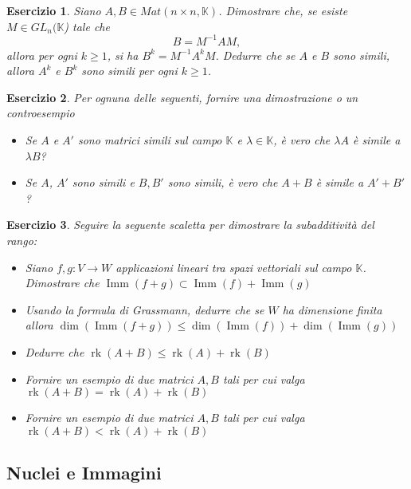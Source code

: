 \documentclass{article}
\newtheorem{es}{Esercizio}
\begin{document}
{\begin{es}
    Siano $A,B\in Mat(n \times n, \mathbb{K})$. Dimostrare che, se esiste $M\in GL_n(\mathbb{K}$) tale che $$B=M^{-1}AM,$$allora per ogni $k\geq 1$, si ha $B^k=M^{-1}A^kM$. Dedurre che se $A$ e $B$ sono simili, allora $A^k$ e $B^k$ sono simili per ogni $k\geq 1$.
\end{es}


\begin{es}
    Per ognuna delle seguenti, fornire una dimostrazione o un controesempio
    \begin{itemize}
        \item 
    Se $A$ e $A'$ sono matrici simili sul campo $\mathbb{K}$ e $\lambda\in\mathbb{K}$, è vero che $\lambda A$ è simile a $\lambda B$?
    \item 
    Se $A$, $A'$ sono simili e $B,B'$ sono simili, è vero che $A+B$ è simile a $A'+B'$? 
    \end{itemize}
\end{es}



\begin{es}
    Seguire la seguente scaletta per dimostrare la subadditività del rango:
    \begin{itemize}
        \item Siano $f,g:V\to W$ applicazioni lineari tra spazi vettoriali sul campo $\mathbb{K}$. Dimostrare che $\operatorname{Imm}(f+g)\subset \operatorname{Imm}(f)+\operatorname{Imm}(g)$
        \item Usando la formula di Grassmann, dedurre che se $W$ ha dimensione finita allora $\dim (\operatorname{Imm}(f+g))\leq \dim (\operatorname{Imm}(f))+\dim(\operatorname{Imm}(g))$
        \item Dedurre che $\operatorname{rk}(A+B)\leq \operatorname{rk}(A)+\operatorname{rk}(B)$
        \item Fornire un esempio di due matrici $A,B$ tali per cui valga $\operatorname{rk}(A+B)= \operatorname{rk}(A)+\operatorname{rk}(B)$
        \item Fornire un esempio di due matrici $A,B$ tali per cui valga $\operatorname{rk}(A+B)< \operatorname{rk}(A)+\operatorname{rk}(B)$
    \end{itemize}
\end{es}



\subsection{Nuclei e Immagini}



}
\end{document}
